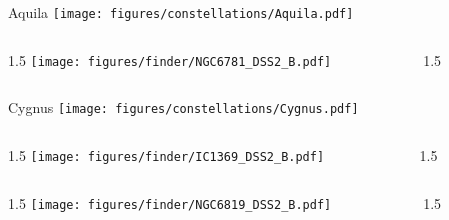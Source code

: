 \documentclass[final]{beamer}
\newlength{\colwidth}
\begin{document}

\begin{frame}[t]{\LARGE Aquila}
  \centering
  \texttt{[image: figures/constellations/Aquila.pdf]}
\end{frame}


\begin{frame}[t]{}
  \begin{columns}[T]
    \begin{column}{1.5\colwidth}
      \centering
      \texttt{[image: figures/finder/NGC6781\_DSS2\_B.pdf]}
    \end{column}
    \begin{column}{1.5\colwidth}
      \Large
      
    \end{column}
  \end{columns}
  \vspace{\fill}
\end{frame}


\begin{frame}[t]{\LARGE Cygnus}
  \centering
  \texttt{[image: figures/constellations/Cygnus.pdf]}
\end{frame}


\begin{frame}[t]{}
  \begin{columns}[T]
    \begin{column}{1.5\colwidth}
      \centering
      \texttt{[image: figures/finder/IC1369\_DSS2\_B.pdf]}
    \end{column}
    \begin{column}{1.5\colwidth}
      \Large
      
    \end{column}
  \end{columns}
  \vspace{\fill}
  \begin{columns}[T]
    \begin{column}{1.5\colwidth}
      \centering
      \texttt{[image: figures/finder/NGC6819\_DSS2\_B.pdf]}
    \end{column}
    \begin{column}{1.5\colwidth}
      \Large
      
    \end{column}
  \end{columns}
\end{frame}
\end{document}
